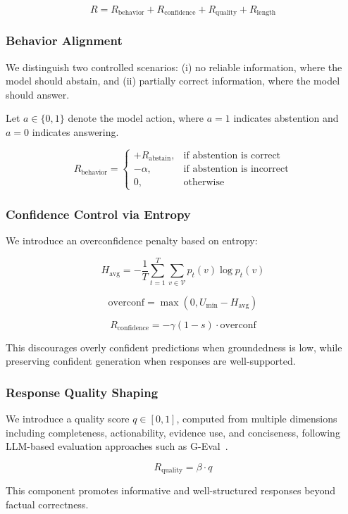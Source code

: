 \[
R = R_{\text{behavior}} + R_{\text{confidence}} + R_{\text{quality}} + R_{\text{length}}
\]

\subsubsection{Behavior Alignment}

We distinguish two controlled scenarios: (i) no reliable information, where the model should abstain, and (ii) partially correct information, where the model should answer.

Let $a \in \{0,1\}$ denote the model action, where $a=1$ indicates abstention and $a=0$ indicates answering.

\[
R_{\text{behavior}} =
\begin{cases}
+R_{\text{abstain}}, & \text{if abstention is correct} \\
-\alpha, & \text{if abstention is incorrect} \\
0, & \text{otherwise}
\end{cases}
\]

\subsubsection{Confidence Control via Entropy}

We introduce an overconfidence penalty based on entropy:

\[
H_{\text{avg}} = -\frac{1}{T} \sum_{t=1}^{T} \sum_{v \in \mathcal{V}} p_t(v)\log p_t(v)
\]

\[
\text{overconf} = \max(0, U_{\min} - H_{\text{avg}})
\]

\[
R_{\text{confidence}} = -\gamma (1 - s)\cdot \text{overconf}
\]

This discourages overly confident predictions when groundedness is low, while preserving confident generation when responses are well-supported.

\subsubsection{Response Quality Shaping}

We introduce a quality score $q \in [0,1]$, computed from multiple dimensions including completeness, actionability, evidence use, and conciseness, following LLM-based evaluation approaches such as G-Eval~\cite{geval}.

\[
R_{\text{quality}} = \beta \cdot q
\]

This component promotes informative and well-structured responses beyond factual correctness.


